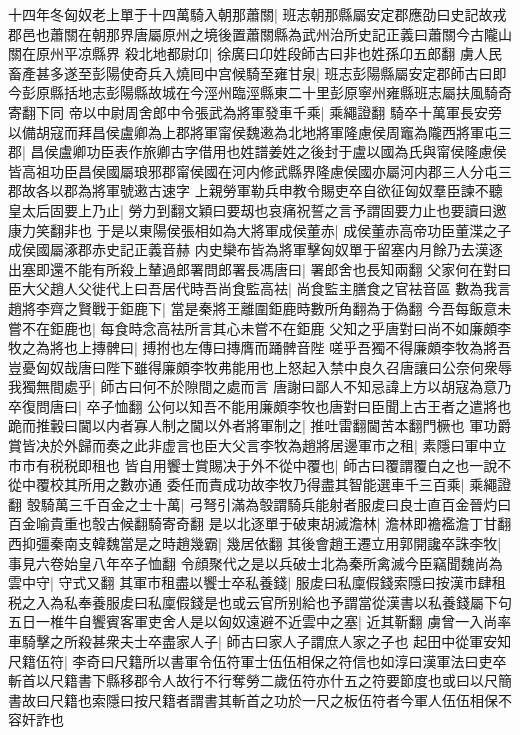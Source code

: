 十四年冬匈奴老上單于十四萬騎入朝那蕭關|{
	班志朝那縣屬安定郡應劭曰史記故戎郡邑也蕭關在朝那界唐屬原州之境後置蕭關縣為武州治所史記正義曰蕭關今古隴山關在原州平凉縣界}
殺北地都尉卬|{
	徐廣曰卬姓段師古曰非也姓孫卬五郎翻}
虜人民畜產甚多遂至彭陽使奇兵入燒囘中宫候騎至雍甘泉|{
	班志彭陽縣屬安定郡師古曰即今彭原縣括地志彭陽縣故城在今涇州臨涇縣東二十里彭原寧州雍縣班志屬扶風騎奇寄翻下同}
帝以中尉周舍郎中令張武為將軍發車千乘|{
	乘繩證翻}
騎卒十萬軍長安旁以備胡寇而拜昌侯盧卿為上郡將軍甯侯魏遫為北地將軍隆慮侯周竈為隴西將軍屯三郡|{
	昌侯盧卿功臣表作旅卿古字借用也姓譜姜姓之後封于盧以國為氏與甯侯隆慮侯皆高祖功臣昌侯國屬琅邪郡甯侯國在河内修武縣界隆慮侯國亦屬河内郡三人分屯三郡故各以郡為將軍號遫古速字}
上親勞軍勒兵申教令賜吏卒自欲征匈奴羣臣諫不聽皇太后固要上乃止|{
	勞力到翻文穎曰要刼也哀痛祝誓之言予謂固要力止也要讀曰邀康力笑翻非也}
于是以東陽侯張相如為大將軍成侯董赤|{
	成侯董赤高帝功臣董渫之子成侯國屬涿郡赤史記正義音赫}
内史欒布皆為將軍擊匈奴單于留塞内月餘乃去漢逐出塞即還不能有所殺上輦過郎署問郎署長馮唐曰|{
	署郎舍也長知兩翻}
父家何在對曰臣大父趙人父徙代上曰吾居代時吾尚食監高袪|{
	尚食監主膳食之官袪音區}
數為我言趙將李齊之賢戰于鉅鹿下|{
	當是秦將王離圍鉅鹿時數所角翻為于偽翻}
今吾每飯意未嘗不在鉅鹿也|{
	每食時念高袪所言其心未嘗不在鉅鹿}
父知之乎唐對曰尚不如廉頗李牧之為將也上摶髀曰|{
	搏拊也左傳曰摶膺而踊髀音陛}
嗟乎吾獨不得廉頗李牧為將吾豈憂匈奴哉唐曰陛下雖得廉頗李牧弗能用也上怒起入禁中良久召唐讓曰公奈何衆辱我獨無間處乎|{
	師古曰何不於隙間之處而言}
唐謝曰鄙人不知忌諱上方以胡寇為意乃卒復問唐曰|{
	卒子恤翻}
公何以知吾不能用廉頗李牧也唐對曰臣聞上古王者之遣將也跪而推轂曰閫以内者寡人制之閫以外者將軍制之|{
	推吐雷翻閫苦本翻門橛也}
軍功爵賞皆决於外歸而奏之此非虚言也臣大父言李牧為趙將居邊軍市之租|{
	素隱曰軍中立市市有税税即租也}
皆自用饗士賞賜决于外不從中覆也|{
	師古曰覆謂覆白之也一說不從中覆校其所用之數亦通}
委任而責成功故李牧乃得盡其智能選車千三百乘|{
	乘繩證翻}
彀騎萬三千百金之士十萬|{
	弓弩引滿為彀謂騎兵能射者服䖍曰良士直百金晉灼曰百金喻貴重也彀古候翻騎寄奇翻}
是以北逐單于破東胡滅澹林|{
	澹林即襜襤澹丁甘翻}
西抑彊秦南支韓魏當是之時趙幾霸|{
	幾居依翻}
其後會趙王遷立用郭開讒卒誅李牧|{
	事見六卷始皇八年卒子恤翻}
令顔聚代之是以兵破士北為秦所禽滅今臣竊聞魏尚為雲中守|{
	守式又翻}
其軍市租盡以饗士卒私養錢|{
	服䖍曰私廩假錢索隱曰按漢市肆租税之入為私奉養服䖍曰私廩假錢是也或云官所别給也予謂當從漢書以私養錢屬下句}
五日一椎牛自饗賓客軍吏舍人是以匈奴遠避不近雲中之塞|{
	近其靳翻}
虜曾一入尚率車騎擊之所殺甚衆夫士卒盡家人子|{
	師古曰家人子謂庶人家之子也}
起田中從軍安知尺籍伍符|{
	李奇曰尺籍所以書軍令伍符軍士伍伍相保之符信也如淳曰漢軍法曰吏卒斬首以尺籍書下縣移郡令人故行不行奪勞二歲伍符亦什五之符要節度也或曰以尺簡書故曰尺籍也索隱曰按尺籍者謂書其斬首之功於一尺之板伍符者今軍人伍伍相保不容奸詐也}
